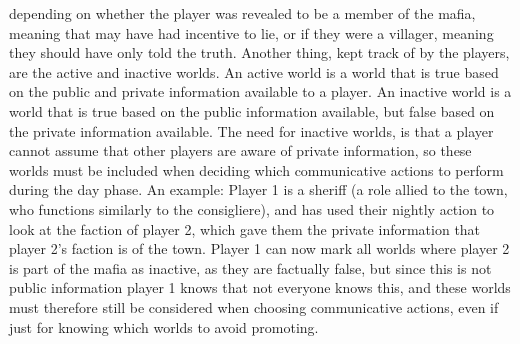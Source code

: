 depending on whether the player was revealed to be a member of the mafia,
meaning that may have had incentive to lie, or if they were a villager, meaning
they should have only told the truth. Another thing, kept track of by the
players, are the active and inactive worlds. An active world is a world that is
true based on the public and private information available to a player. An
inactive world is a world that is true based on the public information
available, but false based on the private information available. The need for
inactive worlds, is that a player cannot assume that other players are aware of
private information, so these worlds must be included when deciding which
communicative actions to perform during the day phase. An example: Player 1 is
a sheriff (a role allied to the town, who functions similarly to the 
consigliere), and has used their nightly action to look at the faction of 
player 2,
which gave them the private information that player 2's faction is of the town.
Player 1 can now mark all worlds where player 2 is part of the mafia as
inactive, as they are factually false, but since this is not public information
player 1 knows that not everyone knows this, and these worlds must therefore
still be considered when choosing communicative actions, even if just for
knowing which worlds to avoid promoting.
